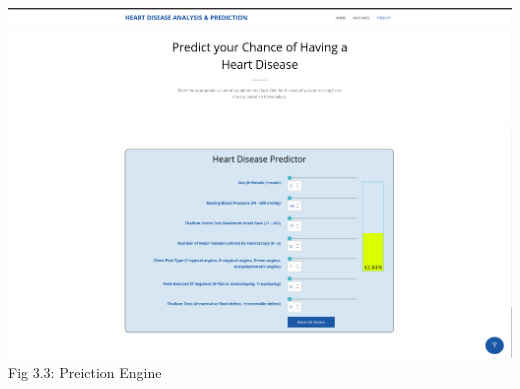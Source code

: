 \documentclass{book}
\begin{document}
\begin{center}
    			
    			\includegraphics[width=17cm]{images/prediction-header}
    			\includegraphics[width=17cm]{images/prediction}
    			Fig 3.3: Preiction Engine
    	\end{center}
    
    	
    	
    	
    	
    
    
  
\end{document}
